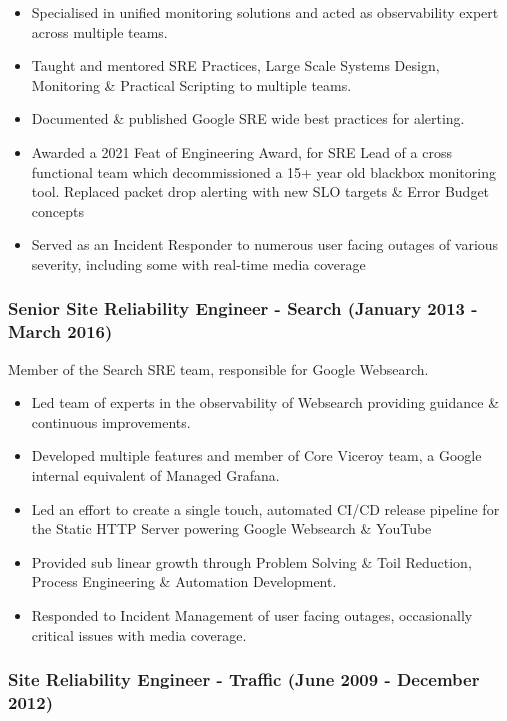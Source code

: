\documentclass[a4paper, 10pt] {article}
\begin{document}
\begin{itemize}[noitemsep]
	\item Specialised in unified monitoring solutions and acted as observability expert across multiple teams.
	\item Taught and mentored SRE Practices, Large Scale Systems Design, Monitoring \& Practical Scripting to multiple teams.
	\item Documented \& published Google SRE wide best practices for alerting.
	\item Awarded a 2021 Feat of Engineering Award, for SRE Lead of a cross functional team which decommissioned a 15+ year old blackbox
		monitoring tool. Replaced packet drop alerting with new SLO targets \& Error Budget concepts
	\item Served as an Incident Responder to numerous user facing outages of various severity, including some with real-time media coverage
\end{itemize}

\subsubsection*{Senior Site Reliability Engineer - Search (January 2013 - March 2016)}

Member of the Search SRE team, responsible for Google Websearch.

\begin{itemize}[noitemsep]
	\item Led team of experts in the observability of Websearch providing guidance \& continuous improvements.
	\item Developed multiple features and member of Core Viceroy team, a Google internal equivalent of Managed Grafana.
  \item Led an effort to create a single touch, automated CI/CD release pipeline for the Static HTTP Server powering Google Websearch \& YouTube
	\item Provided sub linear growth through Problem Solving \& Toil Reduction, Process Engineering \& Automation Development.
	\item Responded to Incident Management of user facing outages, occasionally critical issues with media coverage.
\end{itemize}

\subsubsection*{Site Reliability Engineer - Traffic (June 2009 - December 2012)}
\end{document}
